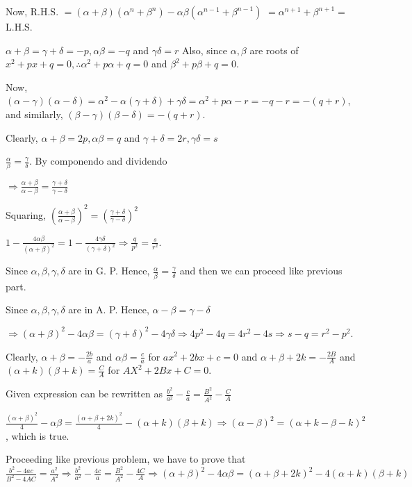   Now, R.H.S. $= (\alpha + \beta)(\alpha^n + \beta^n) - \alpha\beta(\alpha^{n - 1} + \beta^{n - 1})$ $=
  \alpha^{n + 1} + \beta^{n + 1} =$ L.H.S.
\item $\alpha + \beta = \gamma + \delta = -p, \alpha\beta = -q$ and $\gamma\delta = r$ Also, since $\alpha,
  \beta$ are roots of $x^2 + px + q = 0, \therefore \alpha^2 + p\alpha + q = 0$ and $\beta^2 + p\beta + q =
  0$.

  Now, $(\alpha - \gamma)(\alpha - \delta) = \alpha^2 - \alpha(\gamma + \delta) + \gamma\delta = \alpha^2 +
  p\alpha - r = -q - r = -(q + r)$, and similarly, $(\beta - \gamma)(\beta - \delta) = -(q + r)$.
\item Clearly, $\alpha + \beta = 2p, \alpha\beta = q$ and $\gamma + \delta = 2r, \gamma\delta = s$
  \startitemize[i]
  \item $\frac{\alpha}{\beta} = \frac{\gamma}{\delta}$. By componendo and dividendo

    $\Rightarrow \frac{\alpha + \beta}{\alpha - \beta} = \frac{\gamma + \delta}{\gamma - \delta}$

    Squaring, $\left(\frac{\alpha + \beta}{\alpha - \beta}\right)^2 = \left(\frac{\gamma + \delta}{\gamma
      - \delta}\right)^2$

    $1 - \frac{4\alpha\beta}{(\alpha + \beta)^2} = 1 - \frac{4\gamma\delta}{(\gamma + \delta)^2}\Rightarrow
    \frac{q}{p^2} = \frac{s}{r^2}$.
  \item Since $\alpha, \beta, \gamma, \delta$ are in G. P. Hence, $\frac{\alpha}{\beta} = \frac{\gamma}{\delta}$ and
    then we can proceed like previous part.
  \item Since $\alpha, \beta, \gamma, \delta$ are in A. P. Hence, $\alpha - \beta = \gamma - \delta$

    $\Rightarrow (\alpha + \beta)^2 - 4\alpha\beta = (\gamma + \delta)^2 - 4\gamma\delta\Rightarrow 4p^2 -
    4q = 4r^2 - 4s \Rightarrow s - q = r^2 - p^2$.
  \stopitemize
\item Clearly, $\alpha + \beta = -\frac{2b}{a}$ and $\alpha\beta = \frac{c}{a}$ for $ax^2 + 2bx + c = 0$ and
  $\alpha + \beta + 2k = -\frac{2B}{A}$ and $(\alpha + k)(\beta + k) = \frac{C}{A}$ for $AX^2 + 2Bx + C = 0$.

  Given expression can be rewritten as $\frac{b^2}{a^2} - \frac{c}{a} = \frac{B^2}{A^2} - \frac{C}{A}$

  $\frac{(\alpha + \beta)^2}{4} - \alpha\beta = \frac{(\alpha + \beta + 2k)^2}{4} - (\alpha + k)(\beta +
  k)\Rightarrow (\alpha - \beta)^2 = (\alpha + k - \beta - k)^2$, which is true.
\item Proceeding like previous problem, we have to prove that $\frac{b^2 - 4ac}{B^2 - 4AC} = \frac{a^2}{A^2}
  \Rightarrow \frac{b^2}{a^2} - \frac{4c}{a} = \frac{B^2}{A^2} - \frac{4C}{A} \Rightarrow (\alpha + \beta)^2
  - 4\alpha\beta = (\alpha + \beta + 2k)^2 - 4(\alpha + k)(\beta + k)$

